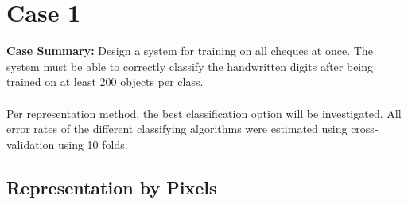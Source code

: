 \newpage
\section{Case 1}
\label{sec:Case1}
\textbf{Case Summary:} Design a system for training on all cheques at once. The system must be able to correctly classify the handwritten digits after being trained on at least 200 objects per class.\\
\\
Per representation method, the best classification option will be investigated. All error rates of the different classifying algorithms were estimated using cross-validation using 10 folds.\\

\subsection{Representation by Pixels}
